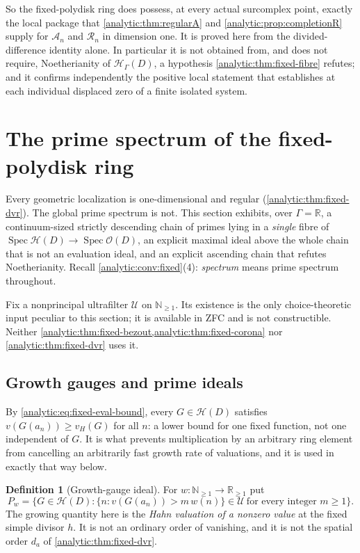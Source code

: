 \documentclass[11pt,letterpaper]{article}
\theoremstyle{definition}
\newtheorem{definition}[theorem]{Definition}
\theoremstyle{remark}
\newcommand{\R}{\mathbb R}
\newcommand{\N}{\mathbb N}
\newcommand{\A}{\mathscr A}
\newcommand{\RR}{\mathscr R}
\newcommand{\HH}{\mathcal H}
\newcommand{\UU}{\mathcal U}
\newcommand{\OO}{\mathcal O}
\newcommand{\Spec}{\operatorname{Spec}}
\newcommand{\vH}{v_{\!H}}
\numberwithin{equation}{section}
\begin{document}
So the fixed-polydisk ring does possess, at every actual surcomplex point,
exactly the local package that \cref{analytic:thm:regularA} and
\cref{analytic:prop:completionR} supply for $\A_n$ and $\RR_n$ in
dimension one. It is proved here from the divided-difference identity
alone. In particular it is not obtained from, and does not require,
Noetherianity of $\HH_\Gamma(D)$, a hypothesis
\cref{analytic:thm:fixed-fibre} refutes; and it confirms independently the
positive local statement that \cite{FiniteDeformations} establishes at each
individual displaced zero of a finite isolated system.
\section{The prime spectrum of the fixed-polydisk ring}
\label{analytic:sec:fixed-spectrum}

Every geometric localization is one-dimensional and regular
(\cref{analytic:thm:fixed-dvr}). The global prime spectrum is not. This
section exhibits, over $\Gamma=\R$, a continuum-sized strictly descending
chain of primes lying in a \emph{single} fibre of
$\Spec\HH(D)\to\Spec\OO(D)$, an explicit maximal ideal above the whole
chain that is not an evaluation ideal, and an explicit ascending chain that
refutes Noetherianity. Recall \cref{analytic:conv:fixed}(4): \emph{spectrum}
means prime spectrum throughout.

Fix a nonprincipal ultrafilter $\UU$ on $\N_{\ge1}$. Its existence is the
only choice-theoretic input peculiar to this section; it is available in
ZFC and is not constructible. Neither
\cref{analytic:thm:fixed-bezout,analytic:thm:fixed-corona} nor
\cref{analytic:thm:fixed-dvr} uses it.

\subsection{Growth gauges and prime ideals}
\label{analytic:subsec:fixed-gauges}
By \eqref{analytic:eq:fixed-eval-bound}, every $G\in\HH(D)$ satisfies
$v(G(a_n))\ge\vH(G)$ for all $n$: a lower bound for one fixed function, not
one independent of $G$. It is what prevents multiplication by an arbitrary
ring element from cancelling an arbitrarily fast growth rate of valuations,
and it is used in exactly that way below.

\begin{definition}[Growth-gauge ideal]\label{analytic:def:fixed-gauge}
For $w:\N_{\ge1}\to\R_{\ge1}$ put
\begin{equation}\label{analytic:eq:fixed-gauge-ideal}
 P_w=\bigl\{G\in\HH(D):
 \{n:v(G(a_n))>m\,w(n)\}\in\UU\ \text{for every integer }m\ge1\bigr\}.
\end{equation}
The growing quantity here is the \emph{Hahn valuation of a nonzero value}
at the fixed simple divisor $h$. It is not an ordinary order of vanishing,
and it is not the spatial order $d_a$ of \cref{analytic:thm:fixed-dvr}.
\end{definition}
\end{document}
